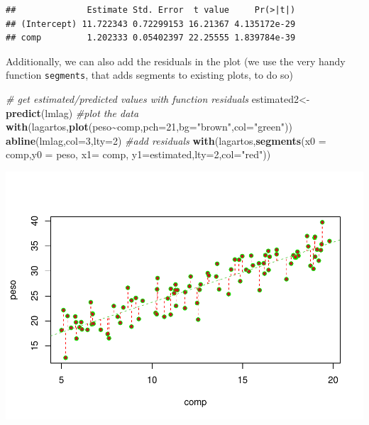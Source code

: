 \documentclass[
]{book}
\newenvironment{Shaded}{\begin{snugshade}}{\end{snugshade}}
\newcommand{\AttributeTok}[1]{\textcolor[rgb]{0.13,0.29,0.53}{#1}}
\newcommand{\CommentTok}[1]{\textcolor[rgb]{0.56,0.35,0.01}{\textit{#1}}}
\newcommand{\DecValTok}[1]{\textcolor[rgb]{0.00,0.00,0.81}{#1}}
\newcommand{\FunctionTok}[1]{\textcolor[rgb]{0.13,0.29,0.53}{\textbf{#1}}}
\newcommand{\NormalTok}[1]{#1}
\newcommand{\OtherTok}[1]{\textcolor[rgb]{0.56,0.35,0.01}{#1}}
\newcommand{\SpecialCharTok}[1]{\textcolor[rgb]{0.81,0.36,0.00}{\textbf{#1}}}
\newcommand{\StringTok}[1]{\textcolor[rgb]{0.31,0.60,0.02}{#1}}
\begin{document}
\begin{verbatim}
##              Estimate Std. Error  t value     Pr(>|t|)
## (Intercept) 11.722343 0.72299153 16.21367 4.135172e-29
## comp         1.202333 0.05402397 22.25555 1.839784e-39
\end{verbatim}

Additionally, we can also add the residuals in the plot (we use the very handy function \texttt{segments}, that adds segments to existing plots, to do so)

\begin{Shaded}
\begin{Highlighting}[]
\CommentTok{\# get estimated/predicted values with function residuals}
\NormalTok{estimated2}\OtherTok{\textless{}{-}}\FunctionTok{predict}\NormalTok{(lmlag)}
\CommentTok{\#plot the data}
\FunctionTok{with}\NormalTok{(lagartos,}\FunctionTok{plot}\NormalTok{(peso}\SpecialCharTok{\textasciitilde{}}\NormalTok{comp,}\AttributeTok{pch=}\DecValTok{21}\NormalTok{,}\AttributeTok{bg=}\StringTok{"brown"}\NormalTok{,}\AttributeTok{col=}\StringTok{"green"}\NormalTok{))}
\FunctionTok{abline}\NormalTok{(lmlag,}\AttributeTok{col=}\DecValTok{3}\NormalTok{,}\AttributeTok{lty=}\DecValTok{2}\NormalTok{)}
\CommentTok{\#add residuals}
\FunctionTok{with}\NormalTok{(lagartos,}\FunctionTok{segments}\NormalTok{(}\AttributeTok{x0 =}\NormalTok{ comp,}\AttributeTok{y0 =}\NormalTok{ peso, }\AttributeTok{x1=}\NormalTok{ comp, }\AttributeTok{y1=}\NormalTok{estimated,}\AttributeTok{lty=}\DecValTok{2}\NormalTok{,}\AttributeTok{col=}\StringTok{"red"}\NormalTok{))}
\end{Highlighting}
\end{Shaded}

\includegraphics{ECOMODbook_files/figure-latex/a6.11-1.pdf}
\end{document}
